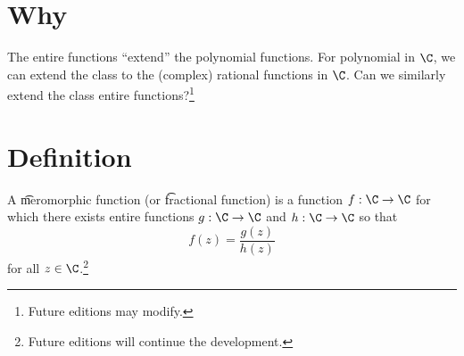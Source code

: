 

\section*{Why}

The entire functions ``extend'' the polynomial functions.
For polynomial in $\C $, we can extend the class to the (complex) rational functions in $\C $.
Can we similarly extend the class entire functions?\footnote{Future editions may modify.}

\section*{Definition}

A \t{meromorphic function} (or \t{fractional function}) is a function $f: \C  \to \C $ for which there exists entire functions $g: \C  \to \C $ and $h: \C  \to \C $ so that
\[
f(z) = \frac{g(z)}{h(z)}
\]
for all $z \in \C $.\footnote{Future editions will continue the development.}

\blankpage